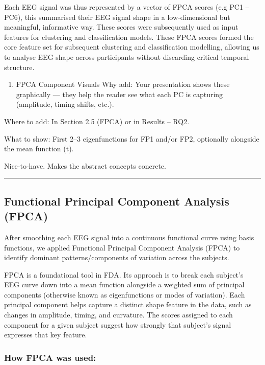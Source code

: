 \documentclass{article}
\providecommand{\tightlist}{%
  \setlength{\itemsep}{0pt}\setlength{\parskip}{0pt}}
\begin{document}
Each EEG signal was thus represented by a vector of FPCA scores (e.g PC1
-- PC6), this summarised their EEG signal shape in a low-dimensional but
meaningful, informative way. These scores were subsequently used as
input features for clustering and classification models. These FPCA
scores formed the core feature set for subsequent clustering and
classification modelling, allowing us to analyse EEG shape across
participants without discarding critical temporal structure.

\begin{enumerate}
\def\labelenumi{\arabic{enumi}.}
\setcounter{enumi}{2}
\tightlist
\item
  FPCA Component Visuals Why add: Your presentation shows these
  graphically --- they help the reader see what each PC is capturing
  (amplitude, timing shifts, etc.).
\end{enumerate}

Where to add: In Section 2.5 (FPCA) or in Results -- RQ2.

What to show: First 2--3 eigenfunctions for FP1 and/or FP2, optionally
alongside the mean function (t).

Nice-to-have. Makes the abstract concepts concrete.

\begin{center}\rule{0.5\linewidth}{0.5pt}\end{center}

\subsection{Functional Principal Component Analysis
(FPCA)}\label{functional-principal-component-analysis-fpca-1}

After smoothing each EEG signal into a continuous functional curve using
basis functions, we applied Functional Principal Component Analysis
(FPCA) to identify dominant patterns/components of variation across the
subjects.

FPCA is a foundational tool in FDA. Its approach is to break each
subject's EEG curve down into a mean function alongside a weighted sum
of principal components (otherwise known as eigenfunctions or modes of
variation). Each principal component helps capture a distinct shape
feature in the data, such as changes in amplitude, timing, and
curvature. The scores assigned to each component for a given subject
suggest how strongly that subject's signal expresses that key feature.

\subsubsection{How FPCA was used:}\label{how-fpca-was-used-1}
\end{document}
